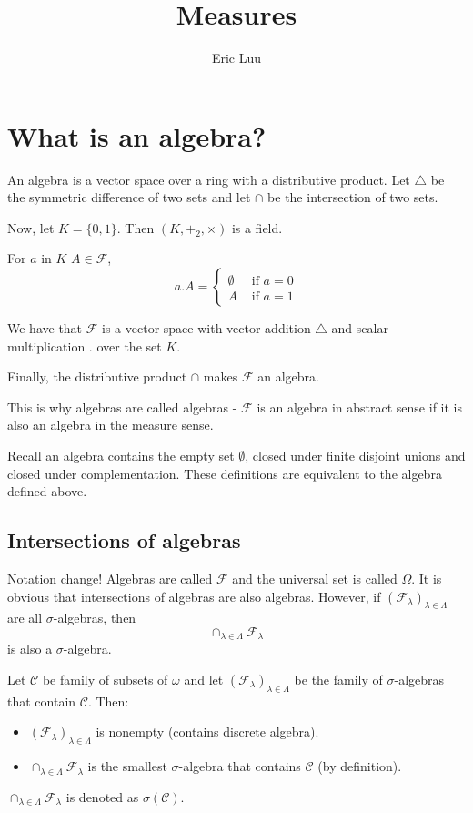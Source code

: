 \documentclass{article}
\title{Measures}
\author{Eric Luu}
\theoremstyle{definition}
\numberwithin{theorem}{section}
\numberwithin{equation}{section}
\begin{document}
\maketitle
\section{What is an algebra?}
An algebra is a vector space over a ring with a distributive product. 
Let $\triangle$ be the symmetric difference of two sets and let $\cap$ be the intersection of two sets. 

Now, let $K = \lbrace 0, 1 \rbrace$. Then $(K, +_2, \times)$ is a field. 

For $a$ in $K$ $A \in \mathcal{F}$,\begin{equation}
	 a . A = 
	 \begin{cases}
	 	\emptyset &\text{ if } a = 0\\
	 	A &\text{ if } a = 1
	 \end{cases}
\end{equation} 

We have that $\mathcal{F}$ is a vector space with vector addition $\triangle$ and scalar multiplication $.$ over the set $K$. 

Finally, the distributive product $\cap$ makes $\mathcal{F}$ an algebra. 

This is why algebras are called algebras - $\mathcal{F}$ is an algebra in abstract sense if it is also an algebra in the measure sense.

Recall an algebra contains the empty set $\emptyset$, closed under finite disjoint unions and closed under complementation. These definitions are equivalent to the algebra defined above.

\subsection{Intersections of algebras}
Notation change! Algebras are called $\mathcal{F}$ and the universal set is called $\Omega$. 
It is obvious that intersections of algebras are also algebras. However, if $\left(\mathcal{F}_\lambda \right)_{\lambda \in \Lambda}$ are all $\sigma$-algebras, then
\begin{equation}
	\cap_{\lambda \in \Lambda} \mathcal{F}_\lambda
\end{equation} 
is also a $\sigma$-algebra. 

Let $\mathcal{C}$ be family of subsets of $\omega$ and let $\left(\mathcal{F}_\lambda \right)_{\lambda \in \Lambda}$ be the family of $\sigma$-algebras that contain $\mathcal{C}$. Then:
\begin{itemize}
	\item $\left(\mathcal{F}_\lambda \right)_{\lambda \in \Lambda}$ is nonempty (contains discrete algebra).
	\item $\cap_{\lambda \in \Lambda} \mathcal{F}_\lambda$ is the smallest $\sigma$-algebra that contains $\mathcal{C}$ (by definition).
\end{itemize}
$\cap_{\lambda \in \Lambda} \mathcal{F}_\lambda$ is denoted as $\sigma(\mathcal{C})$. 
\end{document}
